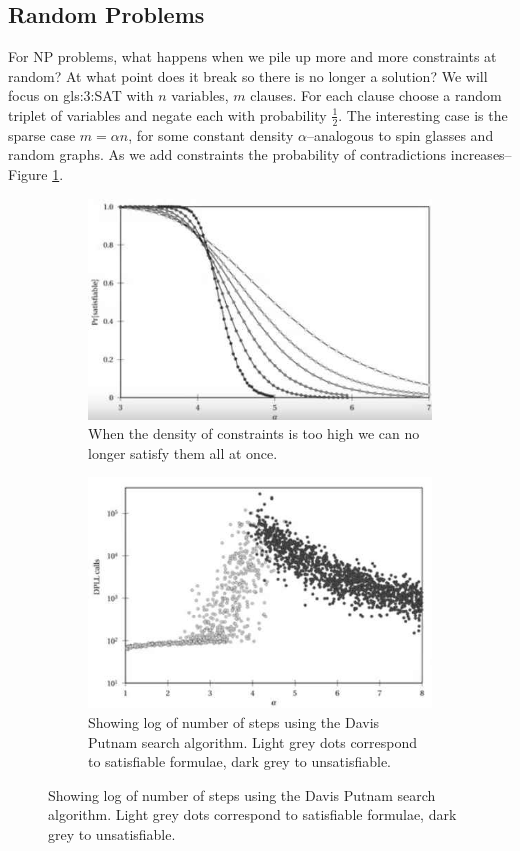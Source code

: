 \documentclass[]{article}
\begin{document}
\subsection{Random Problems}

For NP problems, what happens when we pile up more and more constraints at random? At what point does it break so there is no longer a solution? We will focus on \gls{gls:3:SAT} with $n$ variables, $m$ clauses. For each clause choose a random triplet of variables and negate each with probability $\frac{1}{2}$. The interesting case is the sparse case $m=\alpha n$, for some constant density $\alpha$--analogous to spin glasses and random graphs. As we add constraints the probability of contradictions increases--Figure \ref{fig:trans}.

\begin{figure}[H]
	\caption[Transition from solvability to unsolvability]{Transition from solvability to unsolvability.}
	\begin{subfigure}[t]{0.45\textwidth}
		\caption{When the density of constraints is too high we can no longer satisfy them all at once.}\label{fig:trans}
		\includegraphics[width=\textwidth]{trans}
	\end{subfigure}
	\begin{subfigure}[t]{0.45\textwidth}
		\caption{Showing log of number of steps using the Davis Putnam search algorithm. Light grey dots correspond to satisfiable formulae, dark grey to unsatisfiable.\cite{davis1960computing}}\label{fig:dpll}
		\includegraphics[width=\textwidth]{dpll}
	\end{subfigure}
\end{figure}
\end{document}

